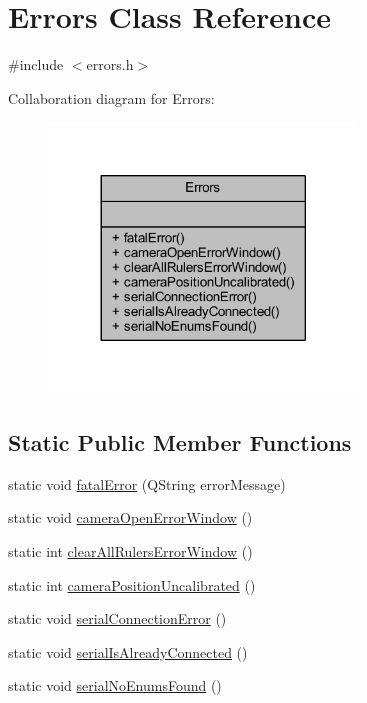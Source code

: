 \hypertarget{class_errors}{}\section{Errors Class Reference}
\label{class_errors}


{\ttfamily \#include $<$errors.\+h$>$}



Collaboration diagram for Errors\+:\nopagebreak
\begin{figure}[H]
\begin{center}
\leavevmode
\includegraphics[width=233pt]{class_errors__coll__graph}
\end{center}
\end{figure}
\subsection*{Static Public Member Functions}
\begin{DoxyCompactItemize}
\item 
static void \mbox{\hyperlink{class_errors_afe4cb66263186b59444271e7ca44e025}{fatal\+Error}} (Q\+String error\+Message)
\item 
static void \mbox{\hyperlink{class_errors_ac17ec34c73179504a0ba63271a005d0a}{camera\+Open\+Error\+Window}} ()
\item 
static int \mbox{\hyperlink{class_errors_a1aad6f02f491d241fafa37b86dbd0c1a}{clear\+All\+Rulers\+Error\+Window}} ()
\item 
static int \mbox{\hyperlink{class_errors_a988959b35354c727ebe2fd884ee34bae}{camera\+Position\+Uncalibrated}} ()
\item 
static void \mbox{\hyperlink{class_errors_a5ed088325fbe34556ae24b8167eaf0fd}{serial\+Connection\+Error}} ()
\item 
static void \mbox{\hyperlink{class_errors_ad05246aaafe8e4e546e7b28bd2a21312}{serial\+Is\+Already\+Connected}} ()
\item 
static void \mbox{\hyperlink{class_errors_a4d1bdcbd36b5df8317a4511226c5d55a}{serial\+No\+Enums\+Found}} ()
\end{DoxyCompactItemize}



